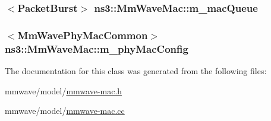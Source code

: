 \subsubsection[{\texorpdfstring{m\+\_\+mac\+Queue}{m_macQueue}}]{$<${\bf Packet\+Burst}$>$ ns3\+::\+Mm\+Wave\+Mac\+::m\+\_\+mac\+Queue\hspace{0.3cm}{\ttfamily [protected]}}\hypertarget{classns3_1_1MmWaveMac_a0e912cf2d226bb57e4179ae3de7636c7}{}\label{classns3_1_1MmWaveMac_a0e912cf2d226bb57e4179ae3de7636c7}
\subsubsection[{\texorpdfstring{m\+\_\+phy\+Mac\+Config}{m_phyMacConfig}}]{$<${\bf Mm\+Wave\+Phy\+Mac\+Common}$>$ ns3\+::\+Mm\+Wave\+Mac\+::m\+\_\+phy\+Mac\+Config\hspace{0.3cm}{\ttfamily [protected]}}\hypertarget{classns3_1_1MmWaveMac_ab443a6adc0e206779d6c2edeacb3ae0d}{}\label{classns3_1_1MmWaveMac_ab443a6adc0e206779d6c2edeacb3ae0d}


The documentation for this class was generated from the following files\+:\begin{DoxyCompactItemize}
\item 
mmwave/model/\hyperlink{mmwave-mac_8h}{mmwave-\/mac.\+h}\item 
mmwave/model/\hyperlink{mmwave-mac_8cc}{mmwave-\/mac.\+cc}\end{DoxyCompactItemize}
